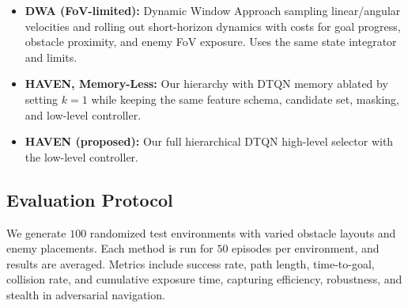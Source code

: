 \documentclass[letterpaper, 10 pt, conference]{ieeeconf}
\begin{document}
\begin{itemize}
    \item \textbf{DWA (FoV-limited):} Dynamic Window Approach sampling linear/angular velocities and rolling out short-horizon dynamics with costs for goal progress, obstacle proximity, and enemy FoV exposure. Uses the same state integrator and limits.
    \item \textbf{HAVEN, Memory-Less:} Our hierarchy with DTQN memory ablated by setting $k{=}1$ while keeping the same feature schema, candidate set, masking, and low-level controller.
    \item \textbf{HAVEN (proposed):} Our full hierarchical DTQN high-level selector with the low-level controller.
\end{itemize}
\subsection{Evaluation Protocol}
We generate $100$ randomized test environments with varied obstacle layouts and enemy placements. Each method is run for $50$ episodes per environment, and results are averaged. Metrics include success rate, path length, time-to-goal, collision rate, and cumulative exposure time, capturing efficiency, robustness, and stealth in adversarial navigation.




\end{document}
